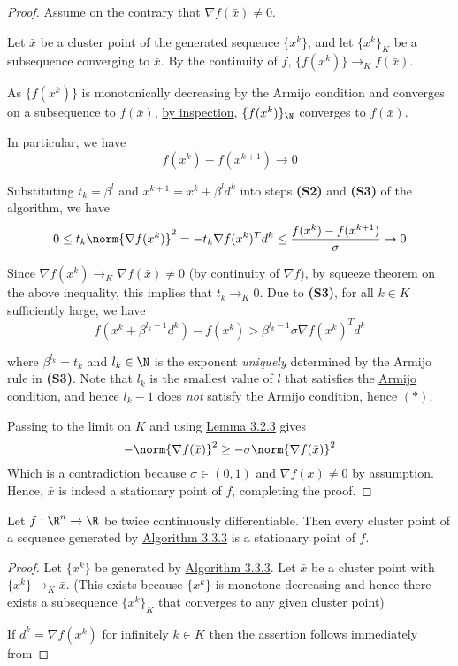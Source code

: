 \begin{proof}
	\def\xk{\{x^k\}}
	\def\grad#1{\nabla f(#1)}
	Assume on the contrary that $\grad{\bar x}\neq0$.

	Let $\bar x$ be a cluster point of the generated sequence $\xk$, and
	let $\xk_K$ be a subsequence converging to $\bar x$. By the
	continuity of $f$, $\{f(x^k)\}\to_Kf(\bar x)$.

	As $\{f(x^k)\}$ is monotonically decreasing by the Armijo condition
	and converges on a subsequence to $f(\bar x)$, \href{aaf3ba6}{by
		inspection}, $\{f(x^k)\}_\N$ converges to $f(\bar x)$.

	In particular, we have
	$$f(x^k)-f(x^{k+1})\to0$$

	Substituting $t_k=\beta^l$ and $x^{k+1}=x^k+\beta^ld^k$ into steps
	\textbf{(S2)} and \textbf{(S3)} of the algorithm, we have
	$$
		0\leq
		t_k\norm{\grad{x^k}}^2=
		-t_k\grad{x^k}^Td^k\leq
		\frac{f(x^k)-f(x^{k+1})}\sigma\to0
	$$

	Since $\grad{x^k}\to_K\grad{\bar x}\neq0$ (by continuity of $\nabla
		f$), by squeeze theorem on the above inequality, this implies that
	$t_k\to_K0$. Due to \textbf{(S3)}, for all $k\in K$ sufficiently
	large, we have
	\begin{equation*}
		f(x^k+\beta^{l_k-1}d^k)-f(x^k)>\beta^{l_k-1}\sigma\grad{x^k}^Td^k\tag*{($*$)}
	\end{equation*}

	where $\beta^{l_k}=t_k$ and $l_k\in\N$ is the exponent
	\textit{uniquely} determined by the Armijo rule in \textbf{(S3)}.
	Note that $l_k$ is the smallest value of $l$ that satisfies the
	\href{fefb024}{Armijo condition}, and hence $l_k-1$ does \textit{not}
	satisfy the Armijo condition, hence $(*)$.

	Passing to the limit on $K$ and using \href{f8e1f12}{Lemma 3.2.3}
	gives
	$$
		-\norm{\nabla f(\bar x)}^2\geq-\sigma\norm{\nabla f(\bar x)}^2
	$$
	Which is a contradiction because $\sigma\in(0,1)$ and $\nabla f(\bar
		x)\neq0$ by assumption. Hence, $\bar x$ is indeed a stationary point
	of $f$, completing the proof.
\end{proof}

\label{a66db73}

Let $f:\R^n\to\R$ be twice continuously differentiable. Then every
cluster point of a sequence generated by \href{a7a5665}{Algorithm
	3.3.3} is a stationary point of $f$.

\begin{proof}

	\def\xk{\{x^k\}}
	\def\grad{\nabla f(x^k)}

	Let $\xk$ be generated by \href{a7a5665}{Algorithm 3.3.3}. Let
	$\bar x$ be a cluster point with $\xk\to_K\bar x$. (This exists
	because $\xk$ is monotone decreasing and hence there exists a
	subsequence $\xk_K$ that converges to any given cluster point)

	If $d^k=\grad$ for infinitely $k\in K$ then the assertion follows immediately from

\end{proof}

